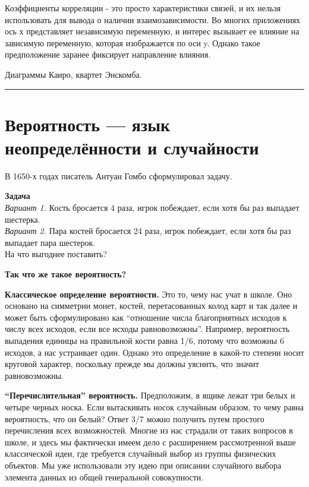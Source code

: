 \documentclass[11pt,a4paper]{article}
\renewcommand{\linethickness}{0.1ex}
\begin{document}
Коэффициенты корреляции - это просто характеристики связей, и их нельзя
использовать для вывода о наличии взаимозависимости. Во многих
приложениях ось х представляет независимую переменную, и интерес
вызывает ее влияние на зависимую переменную, которая изображается по оси
y. Однако такое предположение заранее фиксирует направление влияния.

Диаграммы Каиро, квартет Энскомба.

    \begin{center}\rule{0.5\linewidth}{\linethickness}\end{center}

    \hypertarget{ux432ux435ux440ux43eux44fux442ux43dux43eux441ux442ux44c-ux44fux437ux44bux43a-ux43dux435ux43eux43fux440ux435ux434ux435ux43bux451ux43dux43dux43eux441ux442ux438-ux438-ux441ux43bux443ux447ux430ux439ux43dux43eux441ux442ux438}{%
\section{Вероятность --- язык неопределённости и
случайности}\label{ux432ux435ux440ux43eux44fux442ux43dux43eux441ux442ux44c-ux44fux437ux44bux43a-ux43dux435ux43eux43fux440ux435ux434ux435ux43bux451ux43dux43dux43eux441ux442ux438-ux438-ux441ux43bux443ux447ux430ux439ux43dux43eux441ux442ux438}}

В 1650-х годах писатель Антуан Гомбо сформулировал задачу.

\textbf{Задача}\\
\emph{Вариант 1.} Кость бросается 4 раза, игрок побеждает, если хотя бы
раз выпадает шестерка.\\
\emph{Вариант 2.} Пара костей бросается 24 раза, игрок побеждает, если
хотя бы раз выпадает пара шестерок.\\
На что выгоднее поставить?

    \textbf{Так что же такое вероятность?}

\textbf{Классическое определение вероятности.} Это то, чему нас учат в
школе. Оно основано на симметрии монет, костей, перетасованных колод
карт и так далее и может быть сформулировано как ``отношение числа
благоприятных исходов к числу всех исходов, если все исходы
равновозможны''. Например, вероятность выпадения единицы на правильной
кости равна 1/6, потому что возможны 6 исходов, а нас устраивает один.
Однако это определение в какой-то степени носит круговой характер,
поскольку прежде мы должны уяснить, что значит равновозможны.

\textbf{``Перечислительная'' вероятность.} Предположим, в ящике лежат
три белых и четыре черных носка. Если вытаскивать носок случайным
образом, то чему равна вероятность, что он белый? Ответ 3/7 можно
получить путем простого перечисления всех возможностей. Многие из нас
страдали от таких вопросов в школе, и здесь мы фактически имеем дело с
расширением рассмотренной выше классической идеи, где требуется
случайный выбор из группы физических объектов. Мы уже использовали эту
идею при описании случайного выбора элемента данных из общей генеральной
совокупности.
\end{document}
